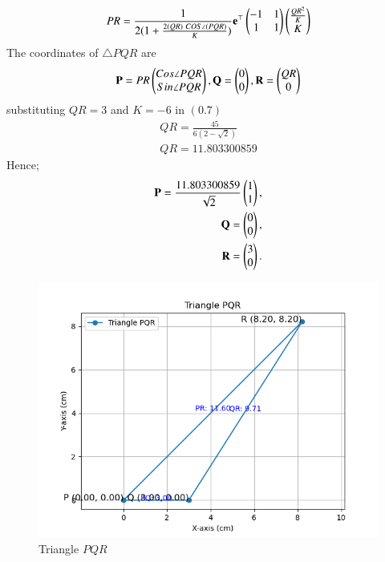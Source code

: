 \documentclass[journal]{IEEEtran}
\begin{document}
\begin{align}
    PR = \frac{1}{2(1+\frac{2(QR)\ COS \angle(PQR)}{K})} \Vec{e}^\top \myvec{-1 &1\\ 1 & 1} \myvec{\frac{QR^2}{K}\\ K}
\end{align}
The coordinates of $\triangle PQR$ are
\begin{align}
    \mathbf P = PR \begin{pmatrix}Cos\angle PQR\\ Sin \angle PQR\end{pmatrix} , \mathbf Q = \begin{pmatrix}0 \\ 0\end{pmatrix} , \mathbf R = \begin{pmatrix}QR \\ 0\end{pmatrix}
\end{align}
substituting $QR = 3$ and $K=-6$ in $(0.7)$
\begin{align}
    QR = \frac{45}{6(2-\sqrt{2})}\\
    QR = 11.803300859
\end{align}
Hence;
\begin{align}
    \mathbf{P} = \frac{11.803300859}{\sqrt{2}} \begin{pmatrix}1 \\ 1\end{pmatrix}, \\
    \mathbf{Q} = \begin{pmatrix}0 \\ 0\end{pmatrix}, \\
    \mathbf{R} = \begin{pmatrix}3 \\ 0\end{pmatrix}.
\end{align}
\begin{figure}[h!]
   \centering
   \includegraphics[width=0.7\linewidth]{figs/triangle_plot.png}
   \caption{Triangle $PQR$}
\end{figure}
\end{document}
